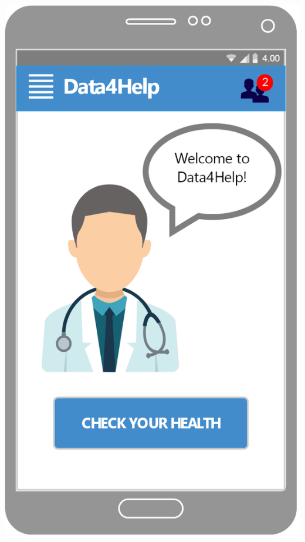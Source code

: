 \begin{center}
\begin{minipage}[c]{.40\textwidth}
\centering
\includegraphics[width=1\textwidth]{Images/userInterface/Home}
\end{minipage}%
\hspace{10mm}%
\begin{minipage}[c]{.40\textwidth}
\centering

\end{minipage}
\end{center}
